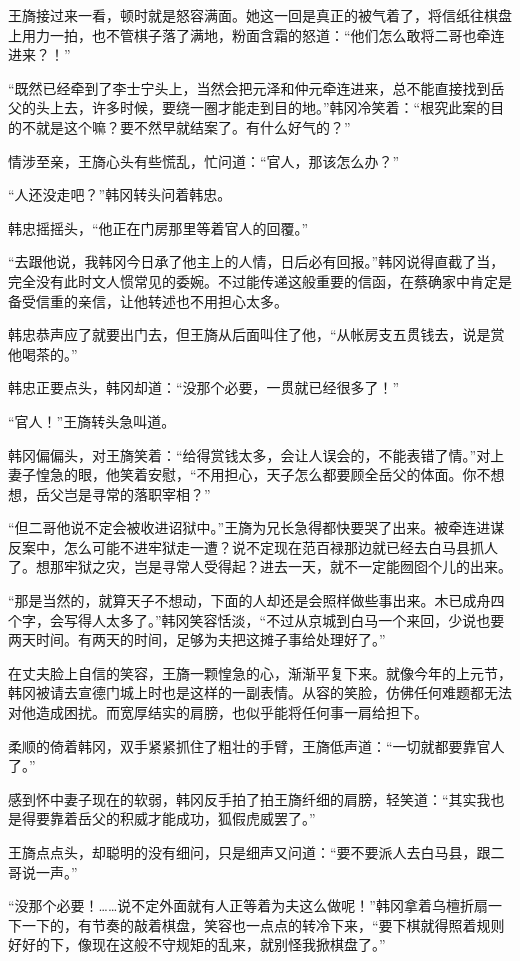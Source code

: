 王旖接过来一看，顿时就是怒容满面。她这一回是真正的被气着了，将信纸往棋盘上用力一拍，也不管棋子落了满地，粉面含霜的怒道：“他们怎么敢将二哥也牵连进来？！”

“既然已经牵到了李士宁头上，当然会把元泽和仲元牵连进来，总不能直接找到岳父的头上去，许多时候，要绕一圈才能走到目的地。”韩冈冷笑着：“根究此案的目的不就是这个嘛？要不然早就结案了。有什么好气的？”

情涉至亲，王旖心头有些慌乱，忙问道：“官人，那该怎么办？”

“人还没走吧？”韩冈转头问着韩忠。

韩忠摇摇头，“他正在门房那里等着官人的回覆。”

“去跟他说，我韩冈今日承了他主上的人情，日后必有回报。”韩冈说得直截了当，完全没有此时文人惯常见的委婉。不过能传递这般重要的信函，在蔡确家中肯定是备受信重的亲信，让他转述也不用担心太多。

韩忠恭声应了就要出门去，但王旖从后面叫住了他，“从帐房支五贯钱去，说是赏他喝茶的。”

韩忠正要点头，韩冈却道：“没那个必要，一贯就已经很多了！”

“官人！”王旖转头急叫道。

韩冈偏偏头，对王旖笑着：“给得赏钱太多，会让人误会的，不能表错了情。”对上妻子惶急的眼，他笑着安慰，“不用担心，天子怎么都要顾全岳父的体面。你不想想，岳父岂是寻常的落职宰相？”

“但二哥他说不定会被收进诏狱中。”王旖为兄长急得都快要哭了出来。被牵连进谋反案中，怎么可能不进牢狱走一遭？说不定现在范百禄那边就已经去白马县抓人了。想那牢狱之灾，岂是寻常人受得起？进去一天，就不一定能囫囵个儿的出来。

“那是当然的，就算天子不想动，下面的人却还是会照样做些事出来。木已成舟四个字，会写得人太多了。”韩冈笑容恬淡，“不过从京城到白马一个来回，少说也要两天时间。有两天的时间，足够为夫把这摊子事给处理好了。”

在丈夫脸上自信的笑容，王旖一颗惶急的心，渐渐平复下来。就像今年的上元节，韩冈被请去宣德门城上时也是这样的一副表情。从容的笑脸，仿佛任何难题都无法对他造成困扰。而宽厚结实的肩膀，也似乎能将任何事一肩给担下。

柔顺的倚着韩冈，双手紧紧抓住了粗壮的手臂，王旖低声道：“一切就都要靠官人了。”

感到怀中妻子现在的软弱，韩冈反手拍了拍王旖纤细的肩膀，轻笑道：“其实我也是得要靠着岳父的积威才能成功，狐假虎威罢了。”

王旖点点头，却聪明的没有细问，只是细声又问道：“要不要派人去白马县，跟二哥说一声。”

“没那个必要！……说不定外面就有人正等着为夫这么做呢！”韩冈拿着乌檀折扇一下一下的，有节奏的敲着棋盘，笑容也一点点的转冷下来，“要下棋就得照着规则好好的下，像现在这般不守规矩的乱来，就别怪我掀棋盘了。”

